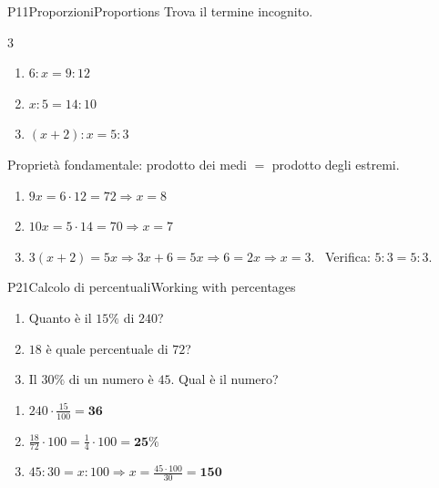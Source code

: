
\begin{esercizio}{P1}{1}{Proporzioni}{Proportions}
Trova il termine incognito. 
\begin{multicols}{3}
\begin{enumerate}
\item $6:x=9:12$
\item $x:5=14:10$
\item $(x+2):x=5:3$
\end{enumerate}
\end{multicols}
\end{esercizio}
\begin{solbox}
Proprietà fondamentale: prodotto dei medi $=$ prodotto degli estremi. 
\begin{enumerate}
\item $9x=6\cdot12=72\Rightarrow \boxed{x=8}$
\item $10x=5\cdot14=70\Rightarrow \boxed{x=7}$
\item $3(x+2)=5x\Rightarrow 3x+6=5x\Rightarrow 6=2x\Rightarrow \boxed{x=3}$. \ Verifica: $5:3=5:3$. \checkmark
\end{enumerate}
\end{solbox}

\begin{esercizio}{P2}{1}{Calcolo di percentuali}{Working with percentages}
\begin{enumerate}
\item Quanto è il $15\%$ di $240$? 
\item $18$ è quale percentuale di $72$? 
\item Il $30\%$ di un numero è $45$. Qual è il numero? 
\end{enumerate}
\end{esercizio}
\begin{solbox}
\begin{enumerate}
\item $240\cdot\frac{15}{100}=\mathbf{36}$
\item $\frac{18}{72}\cdot100=\frac14\cdot100=\mathbf{25\%}$
\item $45:30=x:100\Rightarrow x=\frac{45\cdot100}{30}=\mathbf{150}$
\end{enumerate}
\end{solbox}

